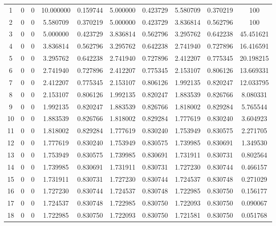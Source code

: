 \documentclass[12pt, a4paper]{article}
\numberwithin{equation}{section}
\begin{document}
\begin{longtable}{cccccccccc}
        1 &  0 &  0 &  10.000000 &  0.159744 &  5.000000 &  0.423729 &  5.580709 &  0.370219 &  100 \\ 
        2 &  0 &  0 &  5.580709 &  0.370219 &  5.000000 &  0.423729 &  3.836814 &  0.562796 &  100 \\ 
        3 &  0 &  0 &  5.000000 &  0.423729 &  3.836814 &  0.562796 &  3.295762 &  0.642238 &  45.451621 \\ 
        4 &  0 &  0 &  3.836814 &  0.562796 &  3.295762 &  0.642238 &  2.741940 &  0.727896 &  16.416591 \\ 
        5 &  0 &  0 &  3.295762 &  0.642238 &  2.741940 &  0.727896 &  2.412207 &  0.775345 &  20.198215 \\ 
        6 &  0 &  0 &  2.741940 &  0.727896 &  2.412207 &  0.775345 &  2.153107 &  0.806126 &  13.669331 \\ 
        7 &  0 &  0 &  2.412207 &  0.775345 &  2.153107 &  0.806126 &  1.992135 &  0.820247 &  12.033795 \\ 
        8 &  0 &  0 &  2.153107 &  0.806126 &  1.992135 &  0.820247 &  1.883539 &  0.826766 &  8.080331 \\ 
        9 &  0 &  0 &  1.992135 &  0.820247 &  1.883539 &  0.826766 &  1.818002 &  0.829284 &  5.765544 \\ 
        10 &  0 &  0 &  1.883539 &  0.826766 &  1.818002 &  0.829284 &  1.777619 &  0.830240 &  3.604923 \\ 
        11 &  0 &  0 &  1.818002 &  0.829284 &  1.777619 &  0.830240 &  1.753949 &  0.830575 &  2.271705 \\ 
        12 &  0 &  0 &  1.777619 &  0.830240 &  1.753949 &  0.830575 &  1.739985 &  0.830691 &  1.349530 \\ 
        13 &  0 &  0 &  1.753949 &  0.830575 &  1.739985 &  0.830691 &  1.731911 &  0.830731 &  0.802564 \\ 
        14 &  0 &  0 &  1.739985 &  0.830691 &  1.731911 &  0.830731 &  1.727230 &  0.830744 &  0.466157 \\ 
        15 &  0 &  0 &  1.731911 &  0.830731 &  1.727230 &  0.830744 &  1.724537 &  0.830748 &  0.271029 \\ 
        16 &  0 &  0 &  1.727230 &  0.830744 &  1.724537 &  0.830748 &  1.722985 &  0.830750 &  0.156177 \\ 
        17 &  0 &  0 &  1.724537 &  0.830748 &  1.722985 &  0.830750 &  1.722093 &  0.830750 &  0.090067 \\
        18 &  0 &  0 &  1.722985 &  0.830750 &  1.722093 &  0.830750 &  1.721581 &  0.830750 &  0.051768 \\ 

\end{longtable}
\end{document}

